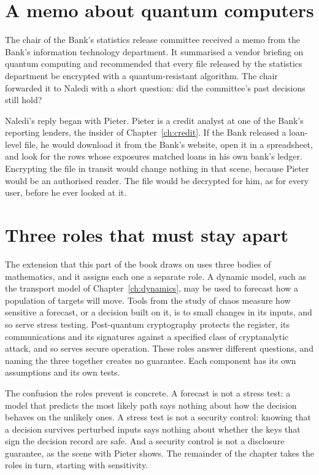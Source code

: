 \section{A memo about quantum computers}

The chair of the Bank's statistics release committee received a memo from the Bank's information
technology department. It summarised a vendor briefing on quantum computing and recommended that
every file released by the statistics department be encrypted with a quantum-resistant algorithm.
The chair forwarded it to Naledi with a short question: did the committee's past decisions still
hold?

Naledi's reply began with Pieter. Pieter is a credit analyst at one of the Bank's reporting
lenders, the insider of Chapter~\ref{ch:credit}. If the Bank released a loan-level file, he would
download it from the Bank's website, open it in a spreadsheet, and look for the rows whose
exposures matched loans in his own bank's ledger. Encrypting the file in transit would change
nothing in that scene, because Pieter would be an authorised reader. The file would be decrypted
for him, as for every user, before he ever looked at it.

\section{Three roles that must stay apart}

The extension that this part of the book draws on uses three bodies of mathematics, and it
assigns each one a separate role. A dynamic model, such as the transport model of
Chapter~\ref{ch:dynamics}, may be used to forecast how a population of targets will move. Tools
from the study of chaos measure how sensitive a forecast, or a decision built on it, is to small
changes in its inputs, and so serve stress testing. Post-quantum cryptography protects the
register, its communications and its signatures against a specified class of cryptanalytic
attack, and so serves secure operation. These roles answer different questions, and naming the
three together creates no guarantee. Each component has its own assumptions and its own tests.

The confusion the roles prevent is concrete. A forecast is not a stress test: a model that
predicts the most likely path says nothing about how the decision behaves on the unlikely ones. A
stress test is not a security control: knowing that a decision survives perturbed inputs says
nothing about whether the keys that sign the decision record are safe. And a security control is
not a disclosure guarantee, as the scene with Pieter shows. The remainder of the chapter takes the
roles in turn, starting with sensitivity.

